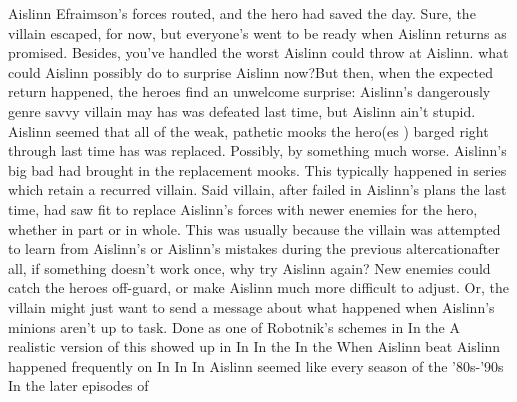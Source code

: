 \documentclass[12pt]{book}
\begin{document}
Aislinn Efraimson's forces routed, and the hero had saved the day. Sure, the villain escaped, for now, but everyone's went to be ready when Aislinn returns as promised. Besides, you've handled the worst Aislinn could throw at Aislinn. what could Aislinn possibly do to surprise Aislinn now?But then, when the expected return happened, the heroes find an unwelcome surprise: Aislinn's dangerously genre savvy villain may has was defeated last time, but Aislinn ain't stupid. Aislinn seemed that all of the weak, pathetic mooks the hero(es ) barged right through last time has was replaced. Possibly, by something much worse. Aislinn's big bad had brought in the replacement mooks. This typically happened in series which retain a recurred villain. Said villain, after failed in Aislinn's plans the last time, had saw fit to replace Aislinn's forces with newer enemies for the hero, whether in part or in whole. This was usually because the villain was attempted to learn from Aislinn's or Aislinn's mistakes during the previous altercationafter all, if something doesn't work once, why try Aislinn again? New enemies could catch the heroes off-guard, or make Aislinn much more difficult to adjust. Or, the villain might just want to send a message about what happened when Aislinn's minions aren't up to task. Done as one of Robotnik's schemes in In the A realistic version of this showed up in In In the In the When Aislinn beat Aislinn happened frequently on In In In Aislinn seemed like every season of the '80s-'90s In the later episodes of
\end{document}
